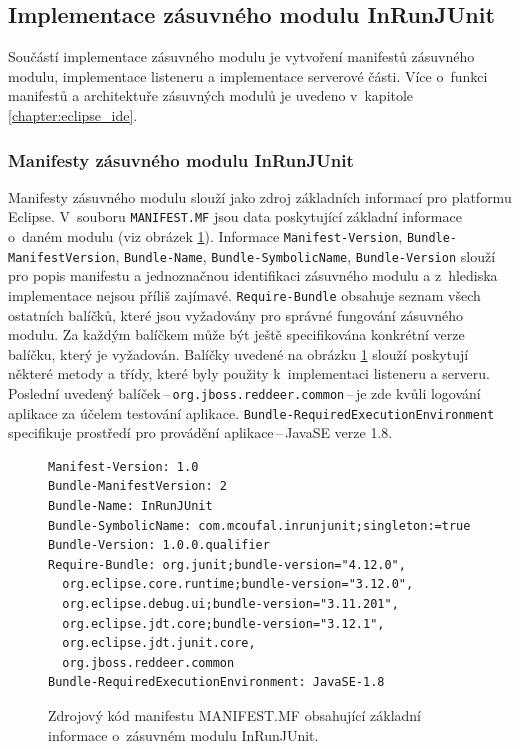    \subsection{Implementace zásuvného modulu InRunJUnit}
    Součástí implementace zásuvného modulu je vytvoření manifestů zásuvného modulu, implementace listeneru a implementace serverové části. Více o~funkci manifestů a architektuře zásuvných modulů je uvedeno v~kapitole \ref{chapter:eclipse_ide}.
      
      \subsubsection{Manifesty zásuvného modulu InRunJUnit}
	Manifesty zásuvného modulu slouží jako zdroj základních informací pro platformu Eclipse. V~souboru \texttt{MANIFEST.MF} jsou data poskytující základní informace o~daném modulu (viz obrázek \ref{code:manifest.mf}). Informace \texttt{Manifest-Version}, \texttt{Bundle-ManifestVersion}, \texttt{Bundle-Name}, \texttt{Bundle-SymbolicName}, \texttt{Bundle-Version} slouží pro popis manifestu a jednoznačnou identifikaci zásuvného modulu a z~hlediska implementace nejsou příliš zajímavé. \texttt{Require-Bundle} obsahuje seznam všech ostatních balíčků, které jsou vyžadovány pro správné fungování zásuvného modulu. Za každým balíčkem může být ještě specifikována konkrétní verze balíčku, který je vyžadován. Balíčky uvedené na obrázku \ref{code:manifest.mf} slouží poskytují některé metody a třídy, které byly použity k~implementaci listeneru a serveru. Poslední uvedený balíček\,--\,\texttt{org.jboss.reddeer.common}\,--\,je zde kvůli logování aplikace za účelem testování aplikace. \texttt{Bundle-RequiredExecutionEnvironment} specifikuje prostředí pro provádění aplikace\,--\,JavaSE verze 1.8. 
	
	\lstset{language=}
	\begin{figure}
	  \begin{lstlisting}[frame=single]
Manifest-Version: 1.0
Bundle-ManifestVersion: 2
Bundle-Name: InRunJUnit
Bundle-SymbolicName: com.mcoufal.inrunjunit;singleton:=true
Bundle-Version: 1.0.0.qualifier
Require-Bundle: org.junit;bundle-version="4.12.0",
  org.eclipse.core.runtime;bundle-version="3.12.0",
  org.eclipse.debug.ui;bundle-version="3.11.201",
  org.eclipse.jdt.core;bundle-version="3.12.1",
  org.eclipse.jdt.junit.core,
  org.jboss.reddeer.common
Bundle-RequiredExecutionEnvironment: JavaSE-1.8
	  \end{lstlisting}
	  \caption{Zdrojový kód manifestu MANIFEST.MF obsahující základní informace o~zásuvném modulu InRunJUnit.}
	  \label{code:manifest.mf}
	\end{figure}
	
